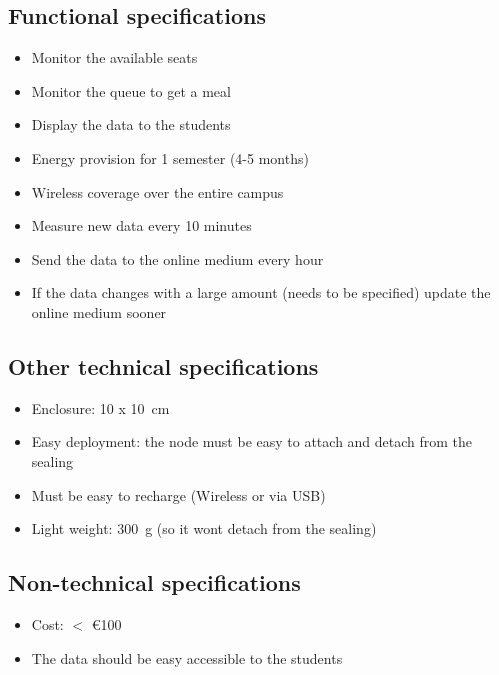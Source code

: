 \documentclass[11pt,a4paper]{article}
\begin{document}
\subsection{Functional specifications}
\begin{itemize}
	\item Monitor the available seats
	\item Monitor the queue to get a meal
	\item Display the data to the students
	\item Energy provision for 1 semester (4-5 months)
	\item Wireless coverage over the entire campus
	\item Measure new data every 10 minutes
	\item Send the data to the online medium every hour 
	\item If the data changes with a large amount (needs to be specified) update the online medium sooner
\end{itemize}

\subsection{Other technical specifications}
\begin{itemize}
	\item Enclosure: 10 x \SI{10}{\centi\meter}
	\item Easy deployment: the node must be easy to attach and detach from the sealing
	\item Must be easy to recharge (Wireless or via USB)
	\item Light weight: \SI{300}{\gram} (so it wont detach from the sealing)
\end{itemize}

\subsection{Non-technical specifications}
\begin{itemize}
	\item Cost: $<$ \euro{100}
	\item The data should be easy accessible to the students
\end{itemize}
\end{document}
